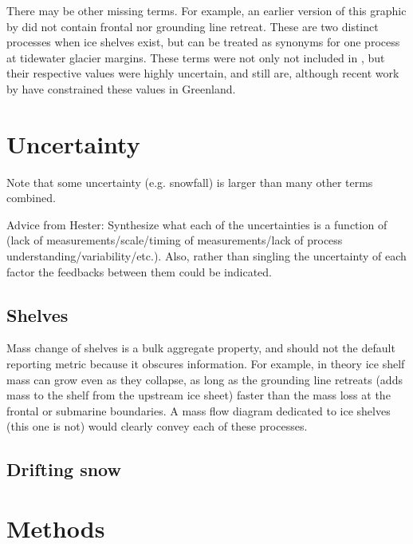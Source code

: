 \documentclass[review,jog]{igs}
\begin{document}
There may be other missing terms. For example, an earlier version of this graphic by \citet[Fig. 2]{cogley_2011} did not contain frontal nor grounding line retreat. These are two distinct processes when ice shelves exist, but can be treated as synonyms for one process at tidewater glacier margins. These terms were not only not included in \citet{cogley_2011}, but their respective values were highly uncertain, and still are, although recent work by \citet{kochtitzky_2023,greene_2024} have constrained these values in Greenland. 

\section{Uncertainty}

Note that some uncertainty (e.g. snowfall) is larger than many other terms combined.

Advice from Hester: Synthesize what each of the uncertainties is a function of (lack of measurements/scale/timing of measurements/lack of process understanding/variability/etc.). Also, rather than singling the uncertainty of each factor the feedbacks between them could be indicated.

\subsection{Shelves}

Mass change of shelves is a bulk aggregate property, and should not the default reporting metric because it obscures information. For example, in theory ice shelf mass can grow even as they collapse, as long as the grounding line retreats (adds mass to the shelf from the upstream ice sheet) faster than the mass loss at the frontal or submarine boundaries. A mass flow diagram dedicated to ice shelves (this one is not) would clearly convey each of these processes. 

\subsection{Drifting snow}


\section{Methods}
\end{document}
